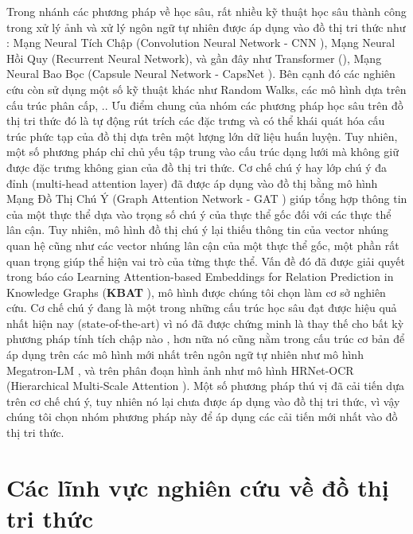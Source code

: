 Trong nhánh các phương pháp về học sâu, rất nhiều kỹ thuật học sâu thành công trong xử lý ảnh và xử lý ngôn ngữ tự nhiên được áp dụng vào đồ thị tri thức như : Mạng Neural Tích Chập (Convolution Neural Network - CNN \cite{lecun1999object}), Mạng Neural Hồi Quy (Recurrent Neural Network\cite{hopfield2007hopfield}), và gần đây như Transformer (\cite{yang2019xlnet}), Mạng Neural Bao Bọc (Capsule Neural Network - CapsNet \cite{sabour2017dynamic}). Bên cạnh đó các nghiên cứu còn sử dụng một số kỹ thuật khác như Random Walks, các mô hình dựa trên cấu trúc phân cấp, .. Ưu điểm chung của nhóm các phương pháp học sâu trên đồ thị tri thức đó là tự động rút trích các đặc trưng và có thể khái quát hóa cấu trúc phức tạp của đồ thị dựa trên một lượng lớn dữ liệu huấn luyện. Tuy nhiên, một số phương pháp chỉ chủ yếu tập trung vào cấu trúc dạng lưới mà không giữ được đặc trưng không gian của đồ thị tri thức. 
Cơ chế chú ý hay lớp chú ý đa đỉnh (multi-head attention layer) đã được áp dụng vào đồ thị bằng mô hình Mạng Đồ Thị Chú Ý (Graph Attention Network - GAT \cite{velivckovic2017graph}) giúp tổng hợp thông tin của một thực thể dựa vào trọng số chú ý của thực thể gốc đối với các thực thể lân cận. Tuy nhiên, mô hình đồ thị chú ý lại thiếu thông tin của vector nhúng quan hệ cũng như các vector nhúng lân cận của một thực thể gốc, một phần rất quan trọng giúp thể hiện vai trò của từng thực thể. Vấn đề đó đã được giải quyết trong báo cáo Learning Attention-based Embeddings for Relation Prediction in
Knowledge Graphs (\textbf{KBAT} \cite{nathani2019learning}), mô hình được chúng tôi chọn làm cơ sở nghiên cứu.
Cơ chế chú ý đang là một trong những cấu trúc học sâu đạt được hiệu quả nhất hiện nay (state-of-the-art) vì nó đã được chứng minh là thay thế cho bất kỳ phương pháp tính tích chập nào \cite{cordonnier2019relationship},
hơn nữa nó cũng nằm trong cấu trúc cơ bản để áp dụng trên các mô hình mới nhất trên ngôn ngữ tự nhiên như mô hình Megatron-LM \cite{shoeybi2019megatron}, và trên phân đoạn hình ảnh như mô hình HRNet-OCR (Hierarchical Multi-Scale Attention \cite{tao2020hierarchical}). Một số phương pháp thú vị \cite{cordonnier2020multi} đã cải tiến dựa trên cơ chế chú ý, tuy nhiên nó lại chưa được áp dụng vào đồ thị tri thức, vì vậy chúng tôi chọn nhóm phương pháp này để áp dụng các cải tiến mới nhất vào đồ thị tri thức.

\section{Các lĩnh vực nghiên cứu về đồ thị tri thức}


